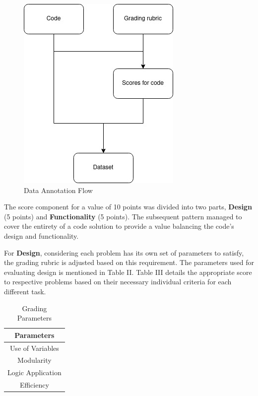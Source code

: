 \documentclass[conference]{IEEEtran}
\begin{document}
\begin{figure}[h]
\centering
\includegraphics[scale=0.6]{data.png}
\caption{Data Annotation Flow}
\label{fig1}
\end{figure}

The score component for a value of 10 points was divided into two parts, \textbf{Design} (5 points) and \textbf{Functionality} (5 points). The subsequent pattern managed to cover the entirety of a code solution to provide a value balancing the code's design and functionality. 

For \textbf{Design}, considering each problem has its own set of parameters to satisfy, the grading rubric is adjusted based on this requirement. The parameters used for evaluating design is mentioned in Table II. Table III details the appropriate score to respective problems based on their necessary individual criteria for each different task.
        
        
\begin{table}[h!]
\centering
\renewcommand{\arraystretch}{1.3}
\begin{tabular}{|c|}
\hline
\textbf{Parameters} \\ \hline
Use of Variables \\ \hline
Modularity \\ \hline
Logic Application \\ \hline
Efficiency \\ \hline
\end{tabular}
\caption{Grading Parameters}
\label{tab:params}
\end{table}        
        
\end{document}
